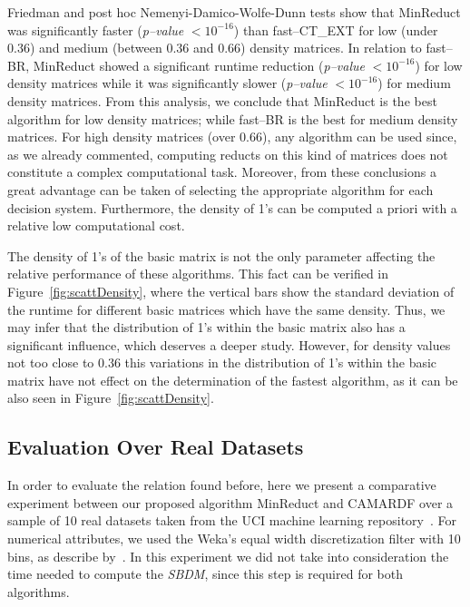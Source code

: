 \documentclass[authoryear,preprint,review,12pt]{elsarticle}
\begin{document}
	Friedman and post hoc Nemenyi-Damico-Wolfe-Dunn tests show that MinReduct was significantly faster (\textit{p--value} $< 10^{-16}$) than fast--CT\_EXT for low (under 0.36) and medium (between 0.36 and 0.66) density matrices. In relation to fast--BR, MinReduct showed a significant runtime reduction (\textit{p--value} $< 10^{-16}$) for low density matrices while it was significantly slower (\textit{p--value} $< 10^{-16}$) for medium density matrices. From this analysis, we conclude that MinReduct is the best algorithm for low density matrices; while fast--BR is the best for medium density matrices. For high density matrices (over 0.66), any algorithm can be used since, as we already commented, computing reducts on this kind of matrices does not constitute a complex computational task. Moreover, from these conclusions a great advantage can be taken of selecting the appropriate algorithm for each decision system. Furthermore, the density of 1's can be computed a priori with a relative low computational cost.
			
	The density of 1's of the basic matrix is not the only parameter affecting the relative performance of these algorithms. This fact can be verified in Figure~\ref{fig:scattDensity}, where the vertical bars show the standard deviation of the runtime for different basic matrices which have the same density. Thus, we may infer that the distribution of 1's within the basic matrix also has a significant influence, which deserves a deeper study. However, for density values not too close to 0.36 this variations in the distribution of 1's	within the basic matrix have not effect on the determination of the fastest algorithm, as it can be also seen in Figure~\ref{fig:scattDensity}.\label{par:distribution}
	
	
\subsection{Evaluation Over Real Datasets}\label{sub:uci}
	In order to evaluate the relation found before, here we present a comparative experiment between our proposed algorithm MinReduct and CAMARDF over a sample of 10 real datasets taken from the UCI machine learning repository~\citep{Bache13}. For numerical attributes, we used the Weka's equal width discretization filter with 10 bins, as describe by~\cite{Flores2010}. In this experiment we did not take into consideration the time needed to compute the \textit{SBDM}, since this step is required for both algorithms. 
	
\end{document}

